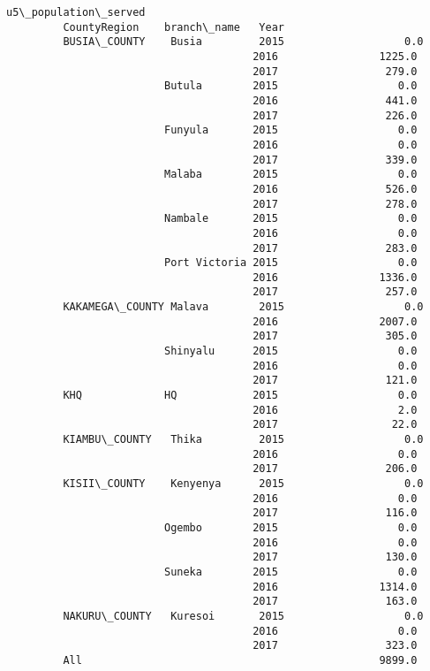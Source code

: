 \documentclass[11pt]{article}
\begin{document}
\begin{Verbatim}[commandchars=\\\{\}]
                                             u5\_population\_served  
         CountyRegion    branch\_name   Year                        
         BUSIA\_COUNTY    Busia         2015                   0.0  
                                       2016                1225.0  
                                       2017                 279.0  
                         Butula        2015                   0.0  
                                       2016                 441.0  
                                       2017                 226.0  
                         Funyula       2015                   0.0  
                                       2016                   0.0  
                                       2017                 339.0  
                         Malaba        2015                   0.0  
                                       2016                 526.0  
                                       2017                 278.0  
                         Nambale       2015                   0.0  
                                       2016                   0.0  
                                       2017                 283.0  
                         Port Victoria 2015                   0.0  
                                       2016                1336.0  
                                       2017                 257.0  
         KAKAMEGA\_COUNTY Malava        2015                   0.0  
                                       2016                2007.0  
                                       2017                 305.0  
                         Shinyalu      2015                   0.0  
                                       2016                   0.0  
                                       2017                 121.0  
         KHQ             HQ            2015                   0.0  
                                       2016                   2.0  
                                       2017                  22.0  
         KIAMBU\_COUNTY   Thika         2015                   0.0  
                                       2016                   0.0  
                                       2017                 206.0  
         KISII\_COUNTY    Kenyenya      2015                   0.0  
                                       2016                   0.0  
                                       2017                 116.0  
                         Ogembo        2015                   0.0  
                                       2016                   0.0  
                                       2017                 130.0  
                         Suneka        2015                   0.0  
                                       2016                1314.0  
                                       2017                 163.0  
         NAKURU\_COUNTY   Kuresoi       2015                   0.0  
                                       2016                   0.0  
                                       2017                 323.0  
         All                                               9899.0  
\end{Verbatim}
            
\end{document}
